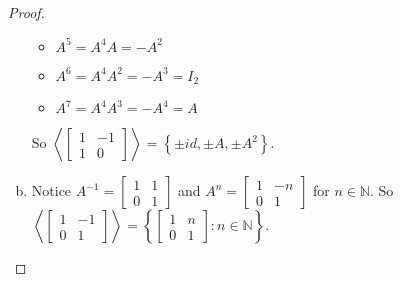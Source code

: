 \documentclass{article}
\theoremstyle{definition}
\newcommand{\N}{\mathbb{N}}
\newcommand{\inv}[1]{#1^{-1}}
\begin{document}
\begin{proof}
\begin{enumerate}[(a)]
\begin{multicols}{3}
\begin{itemize}
				\item $A^5=A^4A=-A^2$
				
				\item $A^6=A^4A^2=-A^3=I_2$
				
				\item $A^7=A^4A^3=-A^4=A$
			\end{itemize}
			\end{multicols} So $\left\langle\left[\begin{smallmatrix}
			1 & -1 \\ 
			1 & 0
			\end{smallmatrix} \right]\right\rangle=\left\{\pm id, \pm A, \pm A^2\right\}$. 
			
			\item Notice $\inv{A}=\left[\begin{smallmatrix}
			1 & 1 \\ 
			0 & 1
			\end{smallmatrix} \right]$ and $A^n=\left[\begin{smallmatrix}
			1 & -n \\ 
			0 & 1
			\end{smallmatrix} \right]$ for $n\in\N$. So $\left\langle\left[\begin{smallmatrix}
			1 & -1 \\ 
			0 & 1
			\end{smallmatrix} \right]\right\rangle=\left\{\left[\begin{smallmatrix}
			1 & n \\ 
			0 & 1
			\end{smallmatrix} \right]:n\in\N\right\}$.
		\end{enumerate}
	\end{proof}
\end{document}
